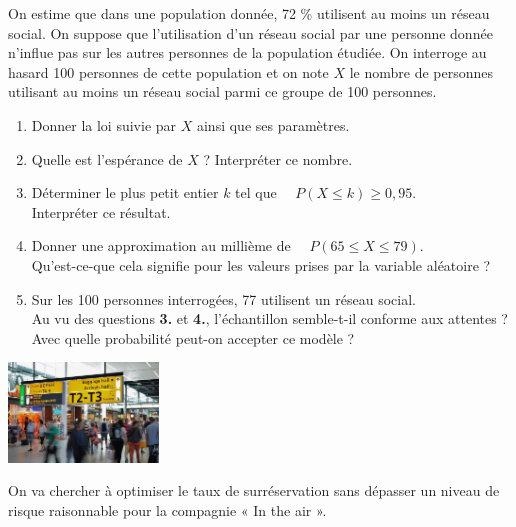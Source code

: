 \documentclass[a4paper,11pt,exos]{nsi} %
\begin{document}
On estime que dans une population donnée, 72 \% utilisent au moins un réseau social. On suppose que l'utilisation d'un réseau social par une personne donnée n'influe pas sur les autres personnes de la population étudiée. On interroge au hasard 100 personnes de cette population et on note $X$ le nombre de personnes utilisant au moins un réseau social parmi ce groupe de 100 personnes.
\begin{enumerate}
    \item Donner la loi suivie par $X$ ainsi que ses paramètres.
    \item Quelle est l'espérance de $X$ ? Interpréter ce nombre.
    \item \faCalculator \hspace*{.2cm} Déterminer le plus petit entier $k$ tel que $\quad P(X\leqslant k)\geqslant 0,95$.\\
    Interpréter ce résultat.
    \item \faCalculator \hspace*{.2cm} Donner une approximation au millième de $\quad P(65\leqslant X\leqslant 79)$.\\
    Qu'est-ce-que cela signifie pour les valeurs prises par la variable aléatoire ?
    \item Sur les 100 personnes interrogées, 77 utilisent un réseau social.\\
    Au vu des questions \textbf{3.} et \textbf{4.}, l'échantillon semble-t-il conforme aux attentes ? Avec quelle probabilité peut-on accepter ce modèle ?
\end{enumerate}

{\includegraphics[width=4cm]{airport-384562_640.jpg}}

On va chercher à optimiser le taux de surréservation sans dépasser un niveau de risque raisonnable pour la compagnie « In the air ».
\end{document}
